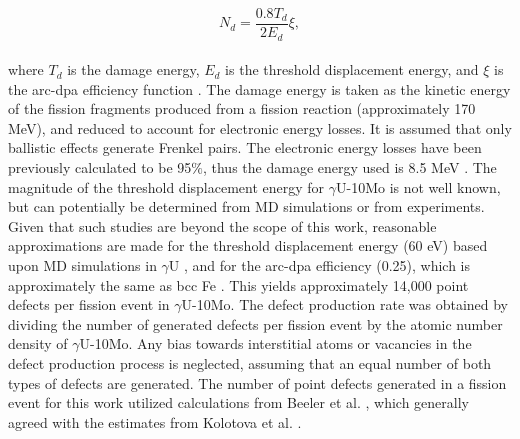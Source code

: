 \documentclass[preprint,12pt]{elsarticle}
\begin{document}
\begin{equation}
N_{d} = \frac{0.8T_{d}}{2E_{d}}\xi,
\end{equation}
\\
\noindent where $T_{d}$ is the damage energy, $E_{d}$ is the threshold displacement energy, and $\xi$ is the arc-dpa efficiency function \cite{nordlund2018improving}. The damage energy is taken as the kinetic energy of the fission fragments produced from a fission reaction (approximately 170 MeV), and reduced to account for electronic energy losses. It is assumed that only ballistic effects generate Frenkel pairs. The electronic energy losses have been previously calculated to be 95$\%$, thus the damage energy used is 8.5 MeV \cite{beeler2021radiation}. The magnitude of the threshold displacement energy for $\gamma$U-10Mo is not well known, but can potentially be determined from MD simulations or from experiments. Given that such studies are beyond the scope of this work, reasonable approximations are made for the threshold displacement energy (60 eV) based upon MD simulations in $\gamma$U \cite{beeler2018calculation}, and for the arc-dpa efficiency (0.25), which is approximately the same as bcc Fe \cite{nordlund2018improving}. This yields approximately 14,000 point defects per fission event in $\gamma$U-10Mo. The defect production rate was obtained by dividing the number of generated defects per fission event by the atomic number density of $\gamma$U-10Mo. Any bias towards interstitial atoms or vacancies in the defect production process is neglected, assuming that an equal number of both types of defects are generated. The number of point defects generated in a fission event for this work utilized calculations from Beeler et al. \cite{beeler2021radiation}, which generally agreed with the estimates from Kolotova et al. \cite{kolotova2019atomistic}. \\
\end{document}
